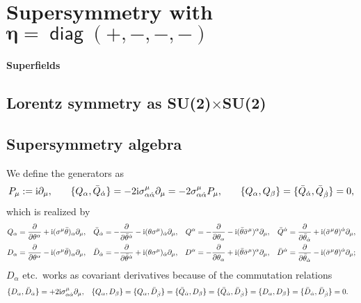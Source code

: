 \documentclass[CheatSheet]{subfiles}
\begin{document}
\summarystyle
\section[Supersymmetry with $\eta=\diag(+,-,-,-)$]{Supersymmetry with $\bm{\eta=\mathop{\mathsf{diag}}(+,-,-,-)}$}



\paragraph{Superfields}


\clearpage
\detailstyle

\subsection{Lorentz symmetry as SU(2)$\times$SU(2)}


\subsection{Supersymmetry algebra}
We define the generators as
\begin{alignat}{3}
 P_\mu
 &:= \mathrm{i}\partial_\mu,
\quad&
 \{Q_\alpha, \bar Q_{\dot\alpha}\}
 &= -2\mathrm{i}\sigma^{\mu}_{\alpha{\dot\alpha}}\partial_\mu = -2\sigma^{\mu}_{\alpha{\dot\alpha}}P_\mu,
\quad&
  \{Q_\alpha, Q_\beta\} =   \{\bar Q_{\dot\alpha}, \bar Q_{\dot\beta}\} = 0,
\end{alignat}
which is realized by
\begin{align*}
Q_\alpha &= \frac{\partial}{\partial \theta^{\alpha}}+\mathrm{i} (\sigma^{\mu}\bar\theta){}_{\alpha}\partial_{\mu},
&
\bar Q_{\dot\alpha}&=-\frac{\partial}{\partial \bar\theta^{{\dot\alpha}}}-\mathrm{i} (\theta \sigma^{\mu}){}_{{\dot\alpha}}\partial_{\mu},
&
Q^\alpha&=-\frac{\partial}{\partial \theta_{\alpha}}-\mathrm{i} (\bar\theta\bar\sigma^{\mu})^{\alpha}\partial_{\mu},
&
\bar Q^{{\dot\alpha}}&=\frac{\partial}{\partial \bar\theta_{{\dot\alpha}}}+\mathrm{i} (\bar\sigma^{\mu}\theta)^{{\dot\alpha}}\partial_{\mu},
\\
D_\alpha&=\frac{\partial}{\partial \theta^{\alpha}}-\mathrm{i} (\sigma^{\mu}\bar\theta){}_{\alpha}\partial_{\mu},
&
\bar D_{\dot\alpha}&=-\frac{\partial}{\partial \bar\theta^{{\dot\alpha}}}+\mathrm{i} (\theta \sigma^{\mu}){}_{{\dot\alpha}}\partial_{\mu},
&
D^\alpha&=-\frac{\partial}{\partial \theta_{\alpha}}+\mathrm{i} (\bar\theta\bar\sigma^{\mu})^{\alpha}\partial_{\mu},
&
\bar D^{\dot\alpha}&=\frac{\partial}{\partial \bar\theta_{{\dot\alpha}}}-\mathrm{i} (\bar\sigma^{\mu}\theta)^{{\dot\alpha}}\partial_{\mu};
\end{align*}
$D_\alpha$ etc.~works as covariant derivatives because of the commutation relations
\begin{align*}
\{D_\alpha, \bar D_{\dot\alpha}\}&=+2\mathrm{i}\sigma^{\mu}_{\alpha{\dot\alpha}}\partial_\mu,&
\{Q_\alpha, D_\beta\}&=
\{Q_\alpha, \bar D_{\dot\beta}\}=
\{\bar Q_{\dot\alpha}, D_\beta\}=
\{\bar Q_{\dot\alpha}, \bar D_{\dot\beta}\}=
\{D_\alpha, D_\beta\}=
\{\bar D_{\dot\alpha}, \bar D_{\dot\beta}\}=0.
\end{align*}
\end{document}
